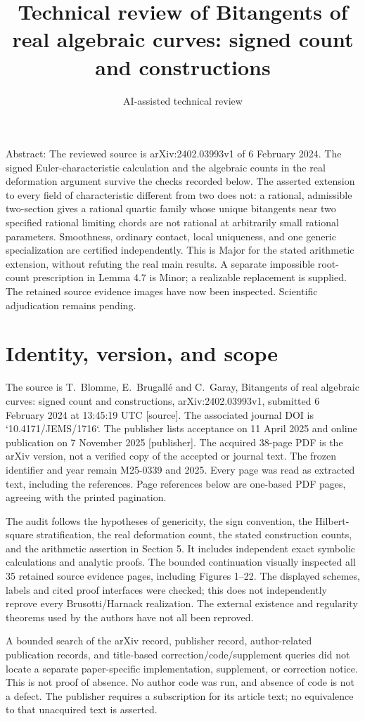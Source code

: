 \documentclass[10pt]{article}
\title{Technical review of
Bitangents of real algebraic curves:
signed count and constructions}
\author{AI-assisted technical review}
\date{}
\begin{document}
\maketitle
Abstract: The reviewed source is arXiv:2402.03993v1 of 6 February 2024. The signed Euler-characteristic calculation and the algebraic counts in the real deformation argument survive the checks recorded below. The asserted extension to every field of characteristic different from two does not: a rational, admissible two-section gives a rational quartic family whose unique bitangents near two specified rational limiting chords are not rational at arbitrarily small rational parameters. Smoothness, ordinary contact, local uniqueness, and one generic specialization are certified independently. This is Major for the stated arithmetic extension, without refuting the real main results. A separate impossible root-count prescription in Lemma 4.7 is Minor; a realizable replacement is supplied. The retained source evidence images have now been inspected. Scientific adjudication remains pending.\par
\section*{Identity, version, and scope}
The source is T. Blomme, E. Brugallé and C. Garay, Bitangents of real algebraic curves: signed count and constructions, arXiv:2402.03993v1, submitted 6 February 2024 at 13:45:19 UTC [source]. The associated journal DOI is `10.4171/JEMS/1716`. The publisher lists acceptance on 11 April 2025 and online publication on 7 November 2025 [publisher]. The acquired 38-page PDF is the arXiv version, not a verified copy of the accepted or journal text. The frozen identifier and year remain M25-0339 and 2025. Every page was read as extracted text, including the references. Page references below are one-based PDF pages, agreeing with the printed pagination.\par
The audit follows the hypotheses of genericity, the sign convention, the Hilbert-square stratification, the real deformation count, the stated construction counts, and the arithmetic assertion in Section 5. It includes independent exact symbolic calculations and analytic proofs. The bounded continuation visually inspected all 35 retained source evidence pages, including Figures 1–22. The displayed schemes, labels and cited proof interfaces were checked; this does not independently reprove every Brusotti/Harnack realization. The external existence and regularity theorems used by the authors have not all been reproved.\par
A bounded search of the arXiv record, publisher record, author-related publication records, and title-based correction/code/supplement queries did not locate a separate paper-specific implementation, supplement, or correction notice. This is not proof of absence. No author code was run, and absence of code is not a defect. The publisher requires a subscription for its article text; no equivalence to that unacquired text is asserted.\par
\end{document}
